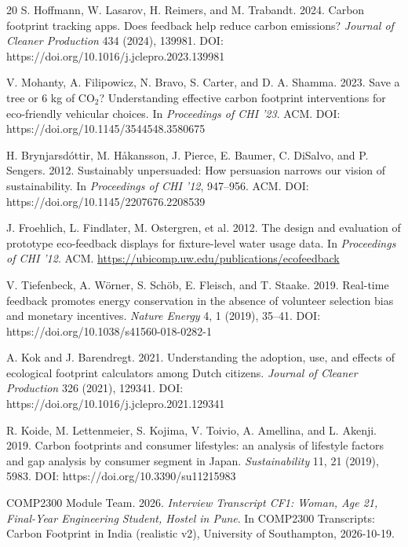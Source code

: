 \documentclass[12pt, a4paper]{article}
\begin{document}
\begin{thebibliography}{20}
S. Hoffmann, W. Lasarov, H. Reimers, and M. Trabandt. 2024. Carbon footprint tracking apps. Does feedback help reduce carbon emissions? \textit{Journal of Cleaner Production} 434 (2024), 139981. DOI: https://doi.org/10.1016/j.jclepro.2023.139981

V. Mohanty, A. Filipowicz, N. Bravo, S. Carter, and D. A. Shamma. 2023. Save a tree or 6 kg of CO$_2$? Understanding effective carbon footprint interventions for eco-friendly vehicular choices. In \textit{Proceedings of CHI '23}. ACM. DOI: https://doi.org/10.1145/3544548.3580675

H. Brynjarsdóttir, M. Håkansson, J. Pierce, E. Baumer, C. DiSalvo, and P. Sengers. 2012. Sustainably unpersuaded: How persuasion narrows our vision of sustainability. In \textit{Proceedings of CHI '12}, 947--956. ACM. DOI: https://doi.org/10.1145/2207676.2208539

J. Froehlich, L. Findlater, M. Ostergren, et al. 2012. The design and evaluation of prototype eco-feedback displays for fixture-level water usage data. In \textit{Proceedings of CHI '12}. ACM. \url{https://ubicomp.uw.edu/publications/ecofeedback}

V. Tiefenbeck, A. Wörner, S. Schöb, E. Fleisch, and T. Staake. 2019. Real-time feedback promotes energy conservation in the absence of volunteer selection bias and monetary incentives. \textit{Nature Energy} 4, 1 (2019), 35--41. DOI: https://doi.org/10.1038/s41560-018-0282-1

A. Kok and J. Barendregt. 2021. Understanding the adoption, use, and effects of ecological footprint calculators among Dutch citizens. \textit{Journal of Cleaner Production} 326 (2021), 129341. DOI: https://doi.org/10.1016/j.jclepro.2021.129341

R. Koide, M. Lettenmeier, S. Kojima, V. Toivio, A. Amellina, and L. Akenji. 2019. Carbon footprints and consumer lifestyles: an analysis of lifestyle factors and gap analysis by consumer segment in Japan. \textit{Sustainability} 11, 21 (2019), 5983. DOI: https://doi.org/10.3390/su11215983

COMP2300 Module Team. 2026. \textit{Interview Transcript CF1: Woman, Age 21, Final-Year Engineering Student, Hostel in Pune}. In COMP2300 Transcripts: Carbon Footprint in India (realistic v2), University of Southampton, 2026-10-19.


\end{thebibliography}
\end{document}
